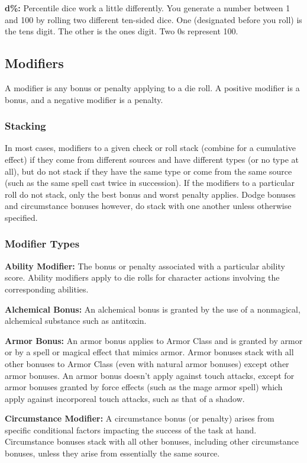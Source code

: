 \textbf{d\%:} Percentile dice work a little differently. You generate a number between 1 and 100 by rolling two different ten-sided dice. One (designated before you roll) is the tens digit. The other is the ones digit. Two 0s represent 100.

\subsection{Modifiers}
A modifier is any bonus or penalty applying to a die roll. A positive modifier is a bonus, and a negative modifier is a penalty.

\subsubsection{Stacking}
In most cases, modifiers to a given check or roll stack (combine for a cumulative effect) if they come from different sources and have different types (or no type at all), but do not stack if they have the same type or come from the same source (such as the same spell cast twice in succession). If the modifiers to a particular roll do not stack, only the best bonus and worst penalty applies. Dodge bonuses and circumstance bonuses however, do stack with one another unless otherwise specified.

\subsubsection{Modifier Types}
\textbf{Ability Modifier:} The bonus or penalty associated with a particular ability score. Ability modifiers apply to die rolls for character actions involving the corresponding abilities.

\textbf{Alchemical Bonus:} An alchemical bonus is granted by the use of a nonmagical, alchemical substance such as antitoxin.

\textbf{Armor Bonus:} An armor bonus applies to Armor Class and is granted by armor or by a spell or magical effect that mimics armor. Armor bonuses stack with all other bonuses to Armor Class (even with natural armor bonuses) except other armor bonuses. An armor bonus doesn't apply against touch attacks, except for armor bonuses granted by force effects (such as the mage armor spell) which apply against incorporeal touch attacks, such as that of a shadow.

\textbf{Circumstance Modifier:} A circumstance bonus (or penalty) arises from specific conditional factors impacting the success of the task at hand. Circumstance bonuses stack with all other bonuses, including other circumstance bonuses, unless they arise from essentially the same source.

